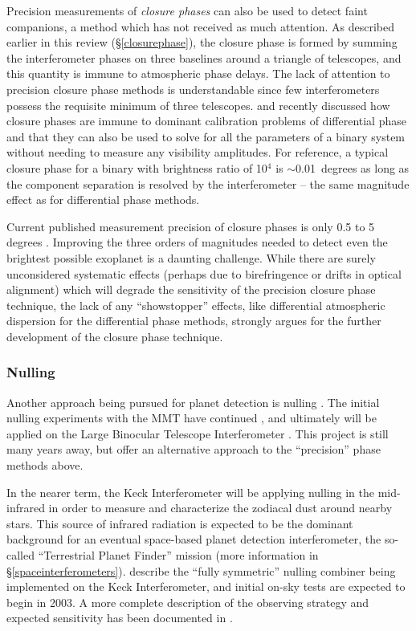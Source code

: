 \documentclass[12pt]{article}
\begin{document}
Precision measurements of {\em closure phases} can also be used to
detect faint companions, a method which has not received as much
attention.  As described earlier in this review
(\S\ref{closurephase}), the closure phase is formed by summing the
interferometer phases on three baselines around a triangle of
telescopes, and this quantity is immune to atmospheric phase delays.
The lack of attention to precision closure phase methods is
understandable since few interferometers possess the requisite minimum
of three telescopes.  \citet{monnier2002} and \citet{segransan2002}
recently discussed how closure phases are immune to dominant
calibration problems of differential phase and that they can also be
used to solve for all the parameters of a binary system without
needing to measure any visibility amplitudes.  For reference, a
typical closure phase for a binary with brightness ratio of 10$^4$ is
$\sim$0.01~degrees as long as the component separation is resolved by
the interferometer -- the same magnitude effect as for differential
phase methods.

Current published measurement precision of closure phases is only 0.5
to 5 degrees \citep{tuthill2000, benson1997, young2000b}. Improving
the three orders of magnitudes needed to detect even the brightest
possible exoplanet is a daunting challenge.  While there are surely
unconsidered systematic effects (perhaps due to birefringence or
drifts in optical alignment) which will degrade the sensitivity of the
precision closure phase technique, the lack of any ``showstopper''
effects, like differential atmospheric dispersion for the differential
phase methods, strongly argues for the further development of the
closure phase technique.  

\subsubsection{Nulling}

Another approach being pursued for planet detection is nulling
\citep{bracewell1978}.  The initial nulling experiments with the MMT
\citep{hinz1998} have continued \citep{hinzthesis}, and ultimately
will be applied on the Large Binocular Telescope Interferometer
\citep{hinz2001b}.  This project is still many years away, but offer
an alternative approach to the ``precision'' phase methods above.

In the nearer term, the Keck Interferometer will be applying nulling
in the mid-infrared in order to measure and characterize the zodiacal
dust around nearby stars.  This source of infrared radiation is
expected to be the dominant background for an eventual space-based 
planet detection interferometer, the so-called ``Terrestrial Planet
Finder'' mission (more information in \S\ref{spaceinterferometers}).
\citet{serabyn2001} describe the ``fully symmetric'' nulling combiner
being implemented on the Keck Interferometer, and initial on-sky tests
are expected to begin in 2003.  A more complete description of the
observing strategy and expected sensitivity has been documented in
\citet{kuchner2003}.
\end{document}
